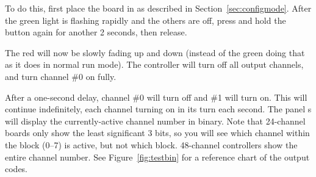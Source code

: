 \documentclass[letterpaper,twoside,onecolumn,openright,final]{memoir}
\begin{document}
To do this, first place the board in  as described in Section~\ref{sec:configmode}.
After the green light is flashing rapidly and the others are off, press and hold the  button
again %
for another 2 seconds, then release.

The red  will now be slowly fading up and down (instead of the green  doing that
as it does in normal run mode).  The controller will turn off all output channels, and turn channel \#0
on fully.  

After a one-second delay, channel \#0 will turn off and \#1 will turn on.  This will continue indefinitely,
each channel turning on in its turn each second.  The panel s will display the currently-active
channel number in binary.  Note that 24-channel boards only show the least significant 3 bits, so you
will see which channel within the block (0--7) is active, but not which block.  48-channel controllers
show the entire channel number.  See Figure~\ref{fig:testbin} for a reference chart of the output
codes.
\end{document}
